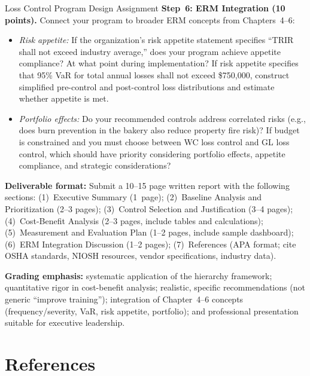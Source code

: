 \documentclass[11pt,openany]{book}
\providecommand{\tightlist}{\setlength{\itemsep}{0pt}\setlength{\parskip}{0pt}}
\begin{document}
\begin{minicase}{Loss Control Program Design Assignment}
\medskip
\textbf{Step~6: ERM Integration (10 points).} Connect your program to broader
ERM concepts from Chapters~4--6:
\begin{itemize}\tightlist
  \item \emph{Risk appetite:} If the organization's risk appetite statement
        specifies ``TRIR shall not exceed industry average,'' does your
        program achieve appetite compliance? At what point during
        implementation? If risk appetite specifies that 95\% VaR for total
        annual losses shall not exceed \$750{,}000, construct simplified
        pre-control and post-control loss distributions and estimate whether
        appetite is met.
  \item \emph{Portfolio effects:} Do your recommended controls address
        correlated risks (e.g., does burn prevention in the bakery also reduce
        property fire risk)? If budget is constrained and you must choose
        between WC loss control and GL loss control, which should have
        priority considering portfolio effects, appetite compliance, and
        strategic considerations?
\end{itemize}

\medskip
\textbf{Deliverable format:} Submit a 10--15 page written report with the
following sections: (1)~Executive Summary (1~page); (2)~Baseline Analysis and
Prioritization (2--3 pages); (3)~Control Selection and Justification (3--4
pages); (4)~Cost-Benefit Analysis (2--3 pages, include tables and
calculations); (5)~Measurement and Evaluation Plan (1--2 pages, include sample
dashboard); (6)~ERM Integration Discussion (1--2 pages); (7)~References (APA
format; cite OSHA standards, NIOSH resources, vendor specifications, industry
data).

\medskip
\textbf{Grading emphasis:} systematic application of the hierarchy framework;
quantitative rigor in cost-benefit analysis; realistic, specific
recommendations (not generic ``improve training''); integration of
Chapter~4--6 concepts (frequency/severity, VaR, risk appetite, portfolio); and
professional presentation suitable for executive leadership.

\end{minicase}

\section*{References}
\begingroup
\sloppy
\end{document}
